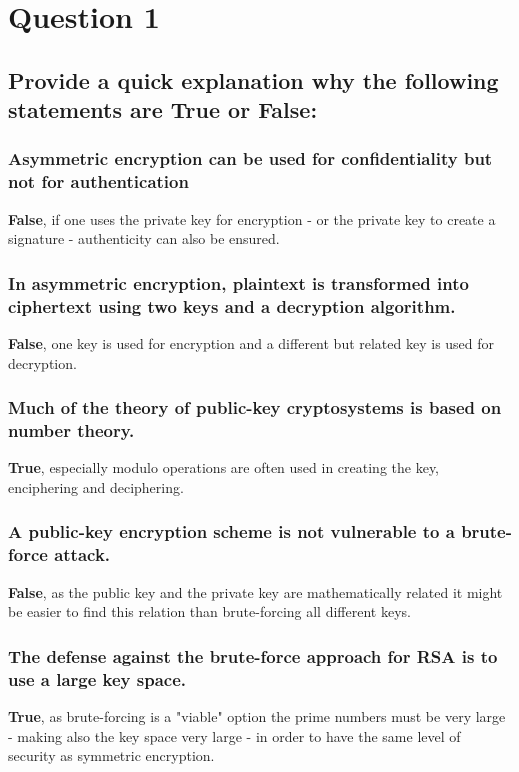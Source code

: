 \documentclass{report}
\begin{document}
	\section{Question 1}
	\startsection
		\renewcommand{\thesubsection}{\thesection.\Alph{subsection}}
		\subsection{Provide a quick explanation why the following statements are True or False:}
		\startsubsection
			\subsubsection{Asymmetric encryption can be used for confidentiality but not for authentication}
			\startsubsection
				\textbf{False}, if one uses the private key for encryption - or the private key to create a signature - authenticity can also be ensured.
			\closesection
			\subsubsection{In asymmetric encryption, plaintext is transformed into ciphertext using two keys and a decryption algorithm.}
			\startsubsection
				\textbf{False}, one key is used for encryption and a different but related key is used for decryption.
			\closesection
			\subsubsection{Much of the theory of public-key cryptosystems is based on number theory.}
			\startsubsection
				\textbf{True}, especially modulo operations are often used in creating the key, enciphering and deciphering.
			\closesection
			\subsubsection{A public-key encryption scheme is not vulnerable to a brute-force attack.}
			\startsubsection
				\textbf{False}, as the public key and the private key are mathematically related it might be easier to find this relation than brute-forcing all different keys.
			\closesection
			\subsubsection{The defense against the brute-force approach for RSA is to use a large key space.}
			\startsubsection
				\textbf{True}, as brute-forcing is a "viable" option the prime numbers must be very large - making also the key space very large - in order to have the same level of security as symmetric encryption.
			\closesection
		\closesection
	\closesection
\end{document}
